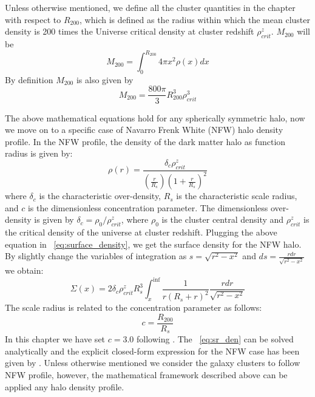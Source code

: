  Unless otherwise mentioned, we define all the cluster quantities in the chapter with respect to $R_{200}$, which is defined as the radius within which the mean cluster density is 200 times the Universe critical density at cluster redshift $\rho^{z}_{crit}$. $M_{200}$ will be 
 \begin{equation}
 M_{200} = \int^{R_{200}}_{0}  4\pi x^{2} \rho(x) dx
 \end{equation}
 By definition $M_{200}$ is also given by
 \begin{equation}
 M_{200} = \frac{800\pi}{3} R^{3}_{200} \rho^{3}_{crit}
 \end{equation}
 
 The above mathematical equations hold for any spherically symmetric halo, now we move on to a specific case of Navarro Frenk White (NFW) halo density profile.
 In the NFW profile, the density of the dark matter halo as function radius is given by:
 \begin{equation}
 \rho(r)= \frac{\delta_{c}\rho^{z}_{crit}}{(\frac{r}{R_{s}})(1+\frac{r}{R_{s}})^{2}}
 \end{equation}
 where $\delta_{c}$ is the characteristic over-density, $R_{s}$ is the characteristic scale radius, and $c$ is the dimensionless concentration parameter.
 The dimensionless over-density is given by $\delta_{c} = \rho_{0}/\rho^{z}_{crit}$, where $\rho_{0}$ is the cluster central density and  $\rho^{z}_{crit}$  is the critical density of the universe at cluster redshift.
 Plugging the above equation in ~\ref{eq:surface_density}, we get the surface density for the NFW halo. 
 By slightly change the variables of integration as $s=\sqrt{r^{2} - x^{2}}$ and $ds = \frac{rdr}{\sqrt{r^{2} - x^{2}}}$ we obtain:
 \begin{equation}
 \Sigma(x) = 2\delta_{c} \rho^{z}_{crit} R^{3}_{s} \int^{\inf}_{x} \frac{1}{r(R_{s} + r)^{2}} \frac{rdr}{\sqrt{r^{2} - x^{2}}}
 \label{eq:sr_den}
 \end{equation}
 The scale radius is related to the concentration parameter as follows:
 \begin{equation}
 c = \frac{R_{200}}{R_{s}}
 \end{equation}
 In this chapter we have set $c = 3.0$ following \cite{bhattacharya13}.
 The ~\ref{eq:sr_den} can be solved analytically and the explicit closed-form expression for the NFW case has been given by \cite{bartelmann96}.
 Unless otherwise mentioned we consider the galaxy clusters to follow NFW profile, however,  the mathematical framework described above can be applied any halo density profile. 
 
